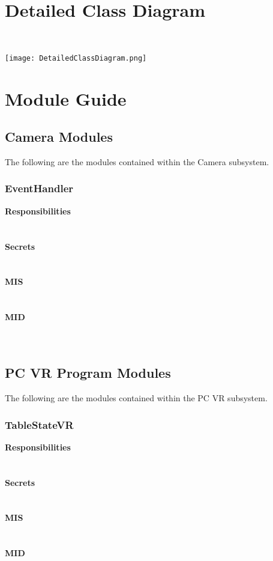 \documentclass[titlepage]{article}
\begin{document}
\section{Detailed Class Diagram}~\\
\begin{center}
	\texttt{[image: DetailedClassDiagram.png]}
\label{fig:yRailFig}
\end{center}
\newpage

\section{Module Guide}
\subsection{Camera Modules}
The following are the modules contained within the Camera subsystem.
\subsubsection{EventHandler}
\textbf{Responsibilities}\\
\\\\%
\textbf{Secrets}\\
\\\\%
\textbf{MIS}\\
\\\\%
\textbf{MID}\\
\\\\%
\subsection{PC VR Program Modules}
The following are the modules contained within the PC VR subsystem.
\subsubsection{TableStateVR}
\textbf{Responsibilities}\\
\\\\%
\textbf{Secrets}\\
\\\\%
\textbf{MIS}\\
\\\\%
\textbf{MID}\\
\\\\%
\end{document}
